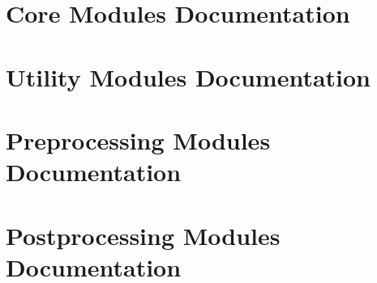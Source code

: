 \documentclass{book}
\begin{document}
\section[Core Modules]{Core Modules Documentation}\label{modules.core}




























\section[Utility Modules]{Utility Modules Documentation}\label{modules.util}






\section[Preprocessing Modules]{Preprocessing Modules Documentation}\label{modules.pre}


\section[Postprocessing Modules]{Postprocessing Modules Documentation}\label{modules.post}



\end{document}
